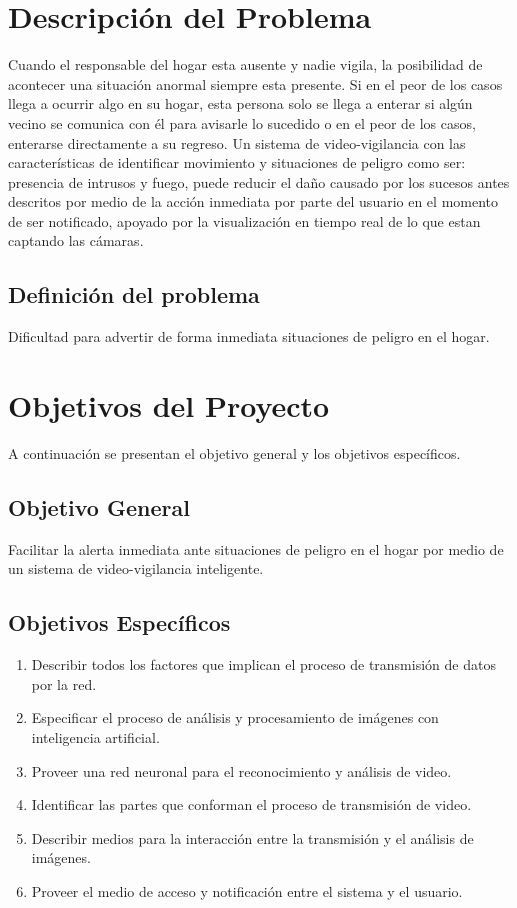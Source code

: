 \section{Descripción del Problema}
Cuando el responsable del hogar esta ausente y nadie vigila, la posibilidad de acontecer una situación anormal siempre esta presente. Si en el peor de los casos llega a ocurrir algo en su hogar, esta persona solo se llega a enterar si algún vecino se comunica con él para avisarle lo sucedido o en el peor de los casos, enterarse directamente a su regreso. Un sistema de video-vigilancia con las características de identificar movimiento y situaciones de peligro como ser: presencia de intrusos y fuego, puede reducir el daño causado por los sucesos antes descritos por medio de la acción inmediata por parte del usuario en el momento de ser notificado, apoyado por la visualización en tiempo real de lo que estan captando las cámaras.\\

\subsection{Definición del problema}
Dificultad para advertir de forma inmediata situaciones de peligro en el hogar.\\

\section{Objetivos del Proyecto}
A continuación se presentan el objetivo general y los objetivos específicos.\\

\subsection{Objetivo General}
Facilitar la alerta inmediata ante situaciones de peligro en el hogar por medio de un sistema de video-vigilancia inteligente.\\

\subsection{Objetivos Específicos}
\begin{enumerate}
    \item Describir todos los factores que implican el proceso de transmisión de datos por la red.
    \item Especificar el proceso de análisis y procesamiento de imágenes con inteligencia artificial.
    \item Proveer una red neuronal para el reconocimiento y análisis de video.
    \item Identificar las partes que conforman el proceso de transmisión de video.
    \item Describir medios para la interacción entre la transmisión y el análisis de imágenes.
    \item Proveer el medio de acceso y notificación entre el sistema y el usuario.
\end{enumerate}

